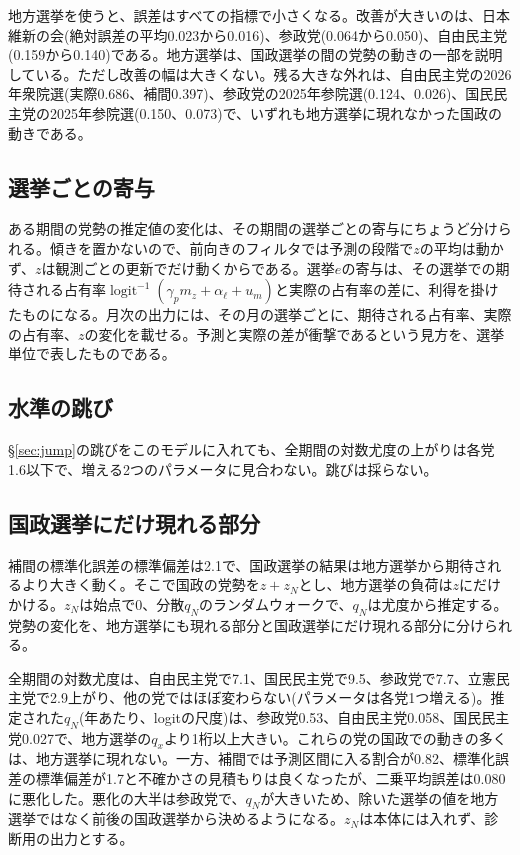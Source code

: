 \documentclass[a4paper,11pt]{ltjsarticle}
\begin{document}
地方選挙を使うと、誤差はすべての指標で小さくなる。改善が大きいのは、日本維新の会(絶対誤差の平均0.023から0.016)、参政党(0.064から0.050)、自由民主党(0.159から0.140)である。地方選挙は、国政選挙の間の党勢の動きの一部を説明している。ただし改善の幅は大きくない。残る大きな外れは、自由民主党の2026年衆院選(実際0.686、補間0.397)、参政党の2025年参院選(0.124、0.026)、国民民主党の2025年参院選(0.150、0.073)で、いずれも地方選挙に現れなかった国政の動きである。

\subsection{選挙ごとの寄与}

ある期間の党勢の推定値の変化は、その期間の選挙ごとの寄与にちょうど分けられる。傾きを置かないので、前向きのフィルタでは予測の段階で$z$の平均は動かず、$z$は観測ごとの更新でだけ動くからである。選挙$e$の寄与は、その選挙での期待される占有率$\operatorname{logit}^{-1}(\gamma_p m_z+\alpha_\ell+u_m)$と実際の占有率の差に、利得を掛けたものになる。月次の出力には、その月の選挙ごとに、期待される占有率、実際の占有率、$z$の変化を載せる。予測と実際の差が衝撃であるという見方を、選挙単位で表したものである。

\subsection{水準の跳び}

\S\ref{sec:jump}の跳びをこのモデルに入れても、全期間の対数尤度の上がりは各党1.6以下で、増える2つのパラメータに見合わない。跳びは採らない。

\subsection{国政選挙にだけ現れる部分}
\label{sec:natdev}

補間の標準化誤差の標準偏差は2.1で、国政選挙の結果は地方選挙から期待されるより大きく動く。そこで国政の党勢を$z+z_N$とし、地方選挙の負荷は$z$にだけかける。$z_N$は始点で0、分散$q_N$のランダムウォークで、$q_N$は尤度から推定する。党勢の変化を、地方選挙にも現れる部分と国政選挙にだけ現れる部分に分けられる。

全期間の対数尤度は、自由民主党で7.1、国民民主党で9.5、参政党で7.7、立憲民主党で2.9上がり、他の党ではほぼ変わらない(パラメータは各党1つ増える)。推定された$q_N$(年あたり、logitの尺度)は、参政党0.53、自由民主党0.058、国民民主党0.027で、地方選挙の$q_x$より1桁以上大きい。これらの党の国政での動きの多くは、地方選挙に現れない。一方、補間では予測区間に入る割合が0.82、標準化誤差の標準偏差が1.7と不確かさの見積もりは良くなったが、二乗平均誤差は0.080に悪化した。悪化の大半は参政党で、$q_N$が大きいため、除いた選挙の値を地方選挙ではなく前後の国政選挙から決めるようになる。$z_N$は本体には入れず、診断用の出力とする。
\end{document}
